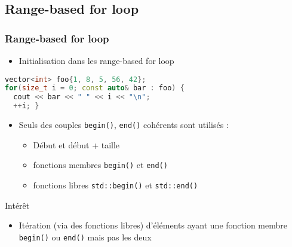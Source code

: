 \documentclass[C++.tex]{subfiles}
\begin{document}
\subsection*{Range-based for loop}
\begin{frame}[fragile]
	\frametitle{Range-based for loop}
	\begin{itemize}
		\item Initialisation dans les range-based for loop
	\end{itemize}

	\begin{lstlisting}[language=C++]
vector<int> foo{1, 8, 5, 56, 42};
for(size_t i = 0; const auto& bar : foo) {
  cout << bar << " " << i << "\n";
  ++i; }\end{lstlisting}

	\begin{itemize}
		\item Seuls des couples \lstinline|begin()|, \lstinline|end()| cohérents sont utilisés :
		\begin{itemize}
			\item \og Début\fg{} et \og début + taille\fg{}
			\item fonctions membres \lstinline|begin()| et \lstinline|end()|
			\item fonctions libres \lstinline|std::begin()| et \lstinline|std::end()|
		\end{itemize}
	\end{itemize}

	\begin{block}{Intérêt}
		\begin{itemize}
			\item Itération (via des fonctions libres) d'éléments ayant une fonction membre \lstinline|begin()| ou \lstinline|end()| mais pas les deux
		\end{itemize}
	\end{block}


\end{frame}
\end{document}
